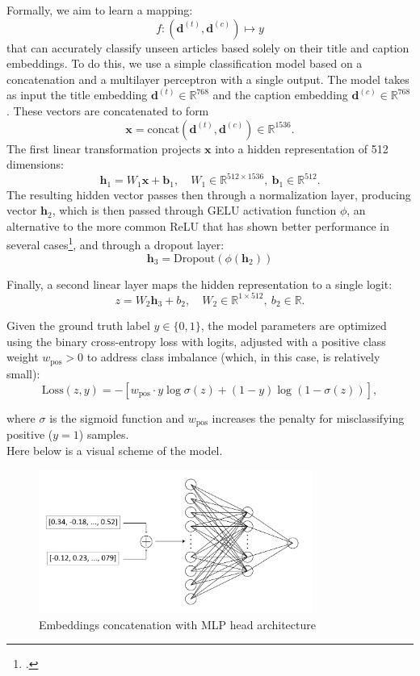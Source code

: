 \documentclass[a4paper,twoside,12pt]{book}
\begin{document}
\noindent Formally, we aim to learn a mapping:
\[
f: (\mathbf{d}^{(t)}, \mathbf{d}^{(c)}) \mapsto y
\]
that can accurately classify unseen articles based solely on their title and caption embeddings. To do this, we use a simple classification model based on a concatenation and a multilayer perceptron with a single output. The model takes as input the title embedding $\mathbf{d}^{(t)} \in \mathbb{R}^{768}$ and the caption embedding $\mathbf{d}^{(c)} \in \mathbb{R}^{768}$.  
These vectors are concatenated to form
\[
\mathbf{x} = \mathrm{concat}(\mathbf{d}^{(t)}, \mathbf{d}^{(c)}) \in \mathbb{R}^{1536}.
\]
The first linear transformation projects $\mathbf{x}$ into a hidden representation of 512 dimensions:
\[
\mathbf{h}_1 = W_1 \mathbf{x} + \mathbf{b}_1, \quad W_1 \in \mathbb{R}^{512 \times 1536},\ \mathbf{b}_1 \in \mathbb{R}^{512}.
\]
The resulting hidden vector passes then through a normalization layer, producing vector $\mathbf{h}_2$, which is then passed through GELU activation function $\phi$, an alternative to the more common ReLU that has shown better performance in several cases\footcite{lee2023}, and through a dropout layer:
\[
\mathbf{h}_3 = \text{Dropout}(\phi(\mathbf{h}_2)
)
\]

Finally, a second linear layer maps the hidden representation to a single logit:
\[
z = W_2 \mathbf{h}_3 + b_2, \quad W_2 \in \mathbb{R}^{1 \times 512},\ b_2 \in \mathbb{R}.
\]

Given the ground truth label $y \in \{0,1\}$, the model parameters are optimized using the binary cross-entropy loss with logits, adjusted with a positive class weight $w_{\text{pos}} > 0$ to address class imbalance (which, in this case, is relatively small):
$$
\text{Loss}(z, y) = -\left[ w_{\text{pos}} \cdot y \log\sigma(z) + (1-y)\log(1-\sigma(z))\right],
$$

where $\sigma$ is the sigmoid function and $w_{\text{pos}}$ increases the penalty for misclassifying positive ($y=1$) samples. \\
Here below is a visual scheme of the model.

\begin{figure}[h!]
	\centering
	\includegraphics[width=0.8\textwidth]{./img/mlp_architecture.png}
	\caption{Embeddings concatenation with MLP head architecture}
	\label{fig:mlp_architecture}
\end{figure}
\end{document}
